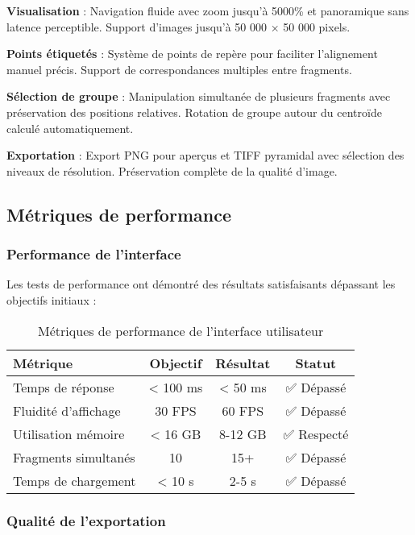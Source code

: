 \documentclass[12pt,a4paper]{report}
\begin{document}
\textbf{Visualisation} : Navigation fluide avec zoom jusqu'à 5000\% et panoramique sans latence perceptible. Support d'images jusqu'à 50 000 × 50 000 pixels.

\textbf{Points étiquetés} : Système de points de repère pour faciliter l'alignement manuel précis. Support de correspondances multiples entre fragments.

\textbf{Sélection de groupe} : Manipulation simultanée de plusieurs fragments avec préservation des positions relatives. Rotation de groupe autour du centroïde calculé automatiquement.

\textbf{Exportation} : Export PNG pour aperçus et TIFF pyramidal avec sélection des niveaux de résolution. Préservation complète de la qualité d'image.

\subsection{Métriques de performance}

\subsubsection{Performance de l'interface}

Les tests de performance ont démontré des résultats satisfaisants dépassant les objectifs initiaux :

\begin{table}[H]
\centering
\begin{tabular}{|l|c|c|c|}
\hline
\textbf{Métrique} & \textbf{Objectif} & \textbf{Résultat} & \textbf{Statut} \\
\hline
Temps de réponse & < 100 ms & < 50 ms & ✅ Dépassé \\
\hline
Fluidité d'affichage & 30 FPS & 60 FPS & ✅ Dépassé \\
\hline
Utilisation mémoire & < 16 GB & 8-12 GB & ✅ Respecté \\
\hline
Fragments simultanés & 10 & 15+ & ✅ Dépassé \\
\hline
Temps de chargement & < 10 s & 2-5 s & ✅ Dépassé \\
\hline
\end{tabular}
\caption{Métriques de performance de l'interface utilisateur}
\label{tab:performance_interface}
\end{table}

\subsubsection{Qualité de l'exportation}
\end{document}
